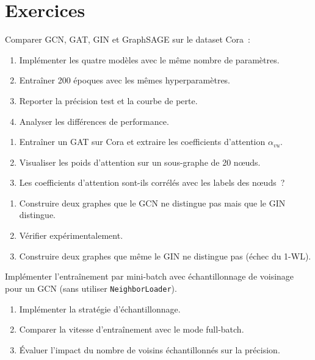\section*{Exercices}

\begin{exercice}
Comparer GCN, GAT, GIN et GraphSAGE sur le dataset Cora~:
\begin{enumerate}
    \item Impl\'ementer les quatre mod\`eles avec le m\^eme nombre de param\`etres.
    \item Entra\^iner 200 \'epoques avec les m\^emes hyperparam\`etres.
    \item Reporter la pr\'ecision test et la courbe de perte.
    \item Analyser les diff\'erences de performance.
\end{enumerate}
\end{exercice}

\begin{exercice}
\begin{enumerate}
    \item Entra\^iner un GAT sur Cora et extraire les coefficients d'attention $\alpha_{vu}$.
    \item Visualiser les poids d'attention sur un sous-graphe de 20 n\oe uds.
    \item Les coefficients d'attention sont-ils corr\'el\'es avec les labels des n\oe uds~?
\end{enumerate}
\end{exercice}

\begin{exercice}
\begin{enumerate}
    \item Construire deux graphes que le GCN ne distingue pas mais que le GIN distingue.
    \item V\'erifier exp\'erimentalement.
    \item Construire deux graphes que m\^eme le GIN ne distingue pas (\'echec du 1-WL).
\end{enumerate}
\end{exercice}

\begin{exercice}
Impl\'ementer l'entra\^inement par mini-batch avec \'echantillonnage de voisinage
pour un GCN (sans utiliser \texttt{NeighborLoader}).
\begin{enumerate}
    \item Impl\'ementer la strat\'egie d'\'echantillonnage.
    \item Comparer la vitesse d'entra\^inement avec le mode full-batch.
    \item \'Evaluer l'impact du nombre de voisins \'echantillonn\'es sur la pr\'ecision.
\end{enumerate}
\end{exercice}
